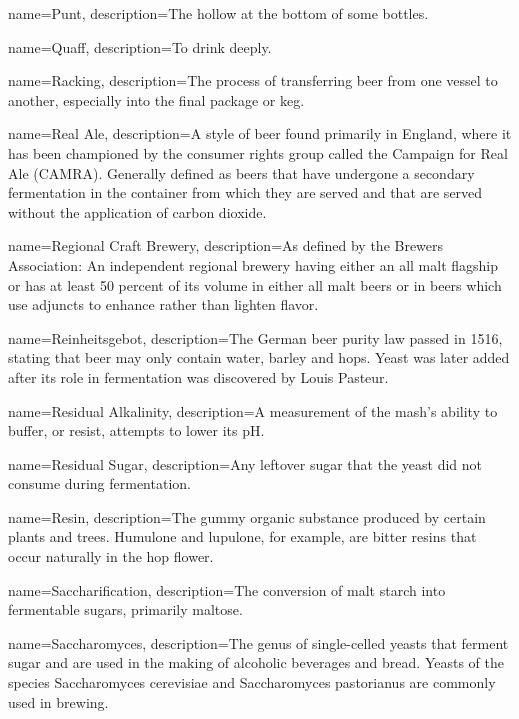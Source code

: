 {
  name={Punt},
  description={The hollow at the bottom of some bottles.}
  }

{
  name={Quaff},
  description={To drink deeply.}
  }

{
  name={Racking},
  description={The process of transferring beer from one vessel to another, especially into the final package or keg.}
  }

{
  name={Real Ale},
  description={A style of beer found primarily in England, where it has been championed by the consumer rights group called the Campaign for Real Ale (CAMRA). Generally defined as beers that have undergone a secondary fermentation in the container from which they are served and that are served without the application of carbon dioxide.}
  }

{
  name={Regional Craft Brewery},
  description={As defined by the Brewers Association: An independent regional brewery having either an all malt flagship or has at least 50 percent of its volume in either all malt beers or in beers which use adjuncts to enhance rather than lighten flavor.}
  }

{
  name={Reinheitsgebot},
  description={The German beer purity law passed in 1516, stating that beer may only contain water, barley and hops. Yeast was later added after its role in fermentation was discovered by Louis Pasteur.}
  }

{
  name={Residual Alkalinity},
  description={A measurement of the mash’s ability to buffer, or resist, attempts to lower its pH.}
  }

{
  name={Residual Sugar},
  description={Any leftover sugar that the yeast did not consume during fermentation.}
  }

{
  name={Resin},
  description={The gummy organic substance produced by certain plants and trees. Humulone and lupulone, for example, are bitter resins that occur naturally in the hop flower.}
  }

{
  name={Saccharification},
  description={The conversion of malt starch into fermentable sugars, primarily maltose.}
  }

{
  name={Saccharomyces},
  description={The genus of single-celled yeasts that ferment sugar and are used in the making of alcoholic beverages and bread. Yeasts of the species Saccharomyces cerevisiae and Saccharomyces pastorianus are commonly used in brewing.}
  }

